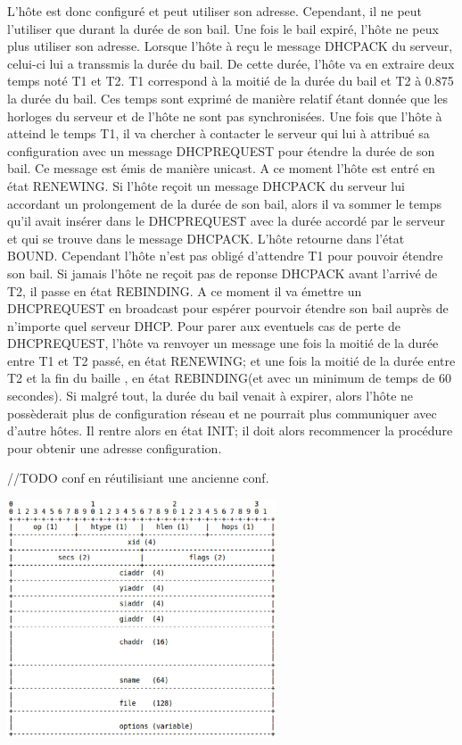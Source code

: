 \documentclass[twoside,openright,a4paper,11pt,french]{article}
\begin{document}
L'hôte est donc configuré et peut utiliser son adresse. Cependant, il ne peut l'utiliser que durant la durée de son bail. Une fois le bail expiré, l'hôte ne peux plus utiliser son adresse. Lorsque l'hôte à reçu le message DHCPACK du serveur, celui-ci lui a transsmis la durée du bail. De cette durée, l'hôte va en extraire deux temps noté T1 et T2. T1 correspond à la moitié de la durée du bail et T2 à 0.875 la durée du bail. Ces temps sont exprimé de manière relatif étant donnée que les horloges du serveur et de l'hôte ne sont pas synchronisées.
Une fois que l'hôte à atteind le temps T1, il va chercher à contacter le serveur qui lui à attribué sa configuration avec un message DHCPREQUEST pour étendre la durée de son bail. Ce message est émis de manière unicast. A ce moment l'hôte est entré en état RENEWING. Si l'hôte reçoit un message DHCPACK du serveur lui accordant un prolongement de la durée de son bail, alors il va sommer le temps qu'il avait insérer dans le DHCPREQUEST avec la durée accordé par le serveur et qui se trouve dans le message DHCPACK. L'hôte retourne dans l'état BOUND. Cependant l'hôte n'est pas obligé d'attendre T1 pour pouvoir étendre son bail.
Si jamais l'hôte ne reçoit pas de reponse DHCPACK avant l'arrivé de T2, il passe en état REBINDING. A ce moment il va émettre un DHCPREQUEST en broadcast pour espérer pourvoir étendre son bail auprès de n'importe quel serveur DHCP. Pour parer aux eventuels cas de perte de DHCPREQUEST, l'hôte va renvoyer un message une fois la moitié de la durée entre T1 et T2 passé, en état RENEWING; et une fois la moitié de la durée entre T2 et la fin du baille , en état REBINDING(et avec un minimum de temps de 60 secondes).
Si malgré tout, la durée du bail venait à expirer, alors l'hôte ne possèderait plus de configuration réseau et ne pourrait plus communiquer avec d'autre hôtes. Il rentre alors en état INIT; il doit alors recommencer la procédure pour obtenir une adresse configuration.

//TODO conf en réutilisiant une ancienne conf.

\includegraphics[width=8cm]{./pics/paquet_dhcp.eps}
\end{document}
